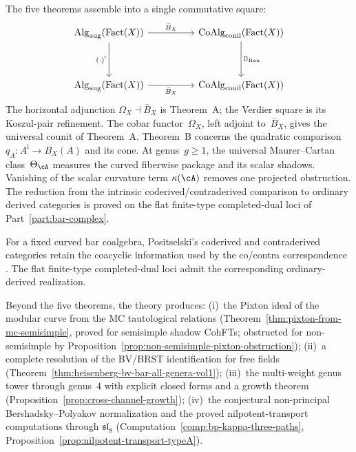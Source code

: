 The five theorems assemble into a single commutative square:
\begin{equation}\label{eq:master-square}
\begin{tikzcd}[row sep=huge, column sep=huge]
\operatorname{Alg}_{\mathrm{aug}}(\operatorname{Fact}(X))
 \arrow[r, "\bar{B}_X"]
 \arrow[d, "(\cdot)^!"']
& \operatorname{CoAlg}_{\mathrm{conil}}(\operatorname{Fact}(X))
 \arrow[d, "\mathbb{D}_{\operatorname{Ran}}"]
\\
\operatorname{Alg}_{\mathrm{aug}}(\operatorname{Fact}(X))
 \arrow[r, "\bar{B}_X"']
& \operatorname{CoAlg}_{\mathrm{conil}}(\operatorname{Fact}(X))
\end{tikzcd}
\end{equation}
The horizontal adjunction $\Omega_X\dashv\bar B_X$ is Theorem~A; the
Verdier square is its Koszul-pair refinement. The cobar
functor~$\Omega_X$, left adjoint to~$\bar{B}_X$, gives the universal
counit of Theorem~A. Theorem~B concerns the quadratic comparison
$q_A\colon A^{\mathrm i}\to B_X(A)$ and its cone. At
genus~$g \geq 1$, the universal Maurer--Cartan class~$\Theta_\cA$
measures the curved fiberwise package and its scalar shadows.
Vanishing of the scalar curvature term $\kappa(\cA)$ removes one
projected obstruction. The
reduction from the intrinsic coderived/contraderived
 comparison to ordinary derived categories is proved on the
 flat finite-type completed-dual loci of Part~\ref{part:bar-complex}.

For a fixed curved bar coalgebra, Positselski's coderived and
contraderived categories retain the coacyclic information used by the
co/contra correspondence \cite{Positselski11}. The flat finite-type
completed-dual loci admit the corresponding ordinary-derived
realization.

Beyond the five theorems, the theory produces:
(i)~the Pixton ideal of the modular curve from the MC
tautological relations
(Theorem~\ref{thm:pixton-from-mc-semisimple}, proved for
semisimple shadow CohFTs; obstructed for non-semisimple by
Proposition~\ref{prop:non-semisimple-pixton-obstruction});
(ii)~a complete resolution of the BV/BRST identification for
free fields
(Theorem~\ref{thm:heisenberg-bv-bar-all-genera-vol1});
(iii)~the multi-weight genus tower through genus~$4$ with
explicit closed forms and a growth theorem
(Proposition~\ref{prop:cross-channel-growth});
(iv)~the conjectural non-principal Bershadsky--Polyakov normalization
and the proved nilpotent-transport computations through $\mathfrak{sl}_8$
(Computation~\ref{comp:bp-kappa-three-paths},
Proposition~\ref{prop:nilpotent-transport-typeA}).


